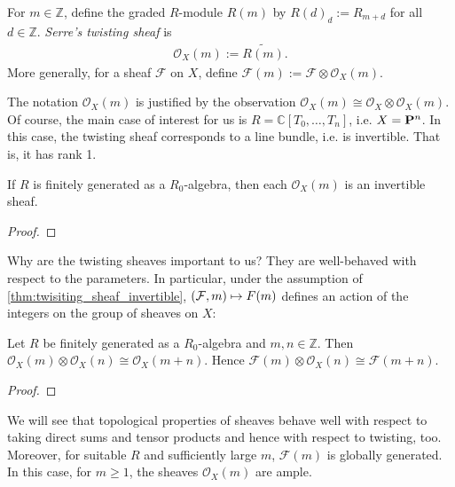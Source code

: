 \documentclass[12pt]{ociamthesis}  %
\begin{document}
\begin{definition}
  For $m\in\mathbb{Z}$, define the graded $R$-module $R(m)$ by
  $R(d)_d := R_{m+d}$ for all $d\in\mathbb{Z}$. \emph{Serre's
  twisting sheaf} is
  \begin{align*}
    \mathcal O_X(m) := \widetilde{R(m)}.
  \end{align*}
  More generally, for a sheaf $\mathcal F$ on $X$, define
  $\mathcal F(m) := \mathcal F \otimes \mathcal O_X(m)$.
\end{definition}
The notation $\mathcal O_X(m)$ is justified by the observation
$\mathcal O_X(m) \cong \mathcal O_X \otimes \mathcal O_X(m)$.
Of course, the main case of interest for us is
$R=\mathbb{C}[T_0,\ldots,T_n]$, i.e. $X=\mathbf{P}^{n}_{}$.
In this case, the twisting sheaf corresponds to a line bundle,
i.e. is invertible. That is, it has rank 1.

\begin{proposition}
  \label{thm:twisiting_sheaf_invertible}
  If $R$ is finitely generated as a $R_0$-algebra, then each
  $\mathcal O_X(m)$ is an invertible sheaf.
  \begin{proof}
    \missingproof
  \end{proof}
\end{proposition}

Why are the twisting sheaves important to us? They are well-behaved
with respect to the parameters. In particular,
under the assumption of \ref{thm:twisiting_sheaf_invertible},
$(\mathcal F,m)\mapsto \mathcal \mathcal F(m)$ defines an action of
the integers on the group of sheaves on $X$:

\begin{lemma}\label{lem:additivity_twisting_sheaf}
  Let $R$ be finitely generated as a $R_0$-algebra and $m,n\in\mathbb{Z}$.
  Then $\mathcal O_X(m) \otimes \mathcal O_X(n) \cong \mathcal O_X(m + n)$. Hence
  $\mathcal F(m) \otimes \mathcal O_X(n) \cong \mathcal F(m+n)$.
  \begin{proof}
    \missingproof
  \end{proof}
\end{lemma}

We will see that topological properties of sheaves behave well
with respect to taking direct sums and tensor products and hence
with respect to twisting, too. Moreover, for suitable $R$ and
sufficiently large $m$, $\mathcal F(m)$ is globally generated. In this
case, for $m\geq 1$, the sheaves $\mathcal O_X(m)$ are ample.
\end{document}
